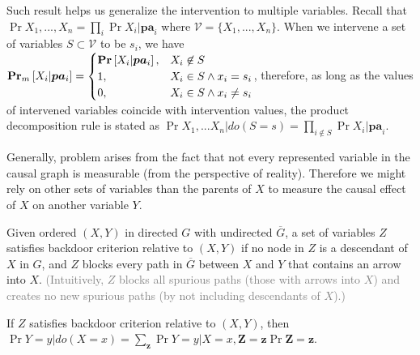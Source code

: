 \documentclass{article}
\newcommand \Prm[1]		{\bt{Pr}_{m} \left[ #1 \right]}
\begin{document}
Such result helps us generalize the intervention to multiple variables. Recall that $\Pr{X_1,...,X_n}=\prod_i \Pr{X_i|\bm{pa}_i}$ where $\mathcal{V}=\{X_1,...,X_n\}$. When we intervene a set of variables $S \subset \mathcal{V}$ to be $s_i$, we have $\Prm{X_i|\bm{pa}_i} = \begin{cases} \Pr{X_i|\bm{pa}_i}, & X_i \not\in S \\ 1, & X_i \in S \land x_i=s_i \\ 0, & X_i \in S \land x_i \ne s_i\end{cases}$, therefore, as long as the values of intervened variables coincide with intervention values, the product decomposition rule is stated as $\displaystyle \Pr{X_1,...X_n|do(S=s)} = \prod_{i \not\in S} \Pr{ X_i | \bm{pa}_i }$.

Generally, problem arises from the fact that not every represented variable in the causal graph is measurable (from the perspective of reality). Therefore we might rely on other sets of variables than the parents of $X$ to measure the causal effect of $X$ on another variable $Y$.

	Given ordered $(X,Y)$ in directed $G$ with undirected $\overline{G}$, a set of variables $Z$ satisfies backdoor criterion relative to $(X,Y)$ if no node in $Z$ is a descendant of $X$ in $G$, and $Z$ blocks every path in $\overline{G}$ between $X$ and $Y$ that contains an arrow into $X$. \textcolor{gray}{(Intuitively, $Z$ blocks all spurious paths (those with arrows into $X$) and creates no new spurious paths (by not including descendants of $X$).)}
	
\Thm {}
	If $Z$ satisfies backdoor criterion relative to $(X,Y)$, then $\Pr{Y=y|do(X=x)} = \sum_{\bm{z}} \Pr{Y=y|X=x,\bm{Z}=\bm{z}} \Pr{\bm{Z}=\bm{z}}$.
\end{document}
